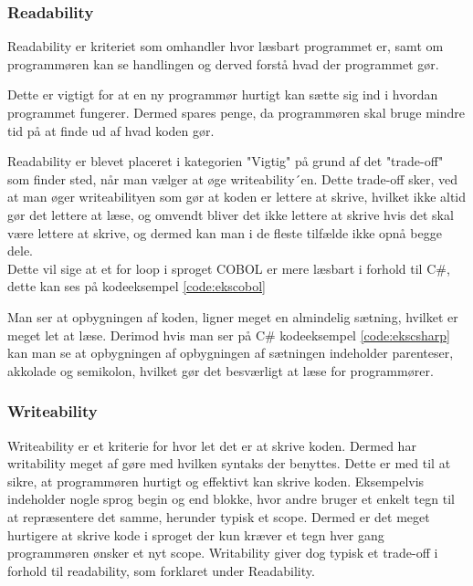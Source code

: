 \subsubsection{Readability} Readability er kriteriet som omhandler hvor læsbart programmet er, samt om programmøren kan se handlingen og derved forstå hvad der programmet gør.

Dette er vigtigt for at en ny programmør hurtigt kan sætte sig ind i hvordan programmet fungerer. Dermed spares penge, da programmøren skal bruge mindre tid på at finde ud af hvad koden gør. 

\noindent Readability er blevet placeret i kategorien "Vigtig" på grund af det "trade-off" som finder sted, når man vælger at øge writeability´en.
Dette trade-off sker, ved at man øger writeabilityen som gør at koden er lettere at skrive, hvilket ikke altid gør det lettere at læse, og omvendt bliver det ikke lettere at skrive hvis det skal være lettere at skrive, og dermed kan man i de fleste tilfælde ikke opnå begge dele.
\\
Dette vil sige at et for loop i sproget COBOL er mere læsbart i forhold til C\#, dette kan ses på kodeeksempel \ref{code:ekscobol}


\noindent Man ser at opbygningen af koden, ligner meget en almindelig sætning, hvilket er meget let at læse. Derimod hvis man ser på C\# kodeeksempel \ref{code:ekscsharp} kan man se at opbygningen af opbygningen af sætningen indeholder parenteser, akkolade og semikolon, hvilket gør det besværligt at læse for programmører.


\subsubsection{Writeability} Writeability er et kriterie for hvor let det er at skrive koden. 
Dermed har writability meget af gøre med hvilken syntaks der benyttes. 
Dette er med til at sikre, at programmøren hurtigt og effektivt kan skrive koden.
Eksempelvis indeholder nogle sprog begin og end blokke, hvor andre bruger et enkelt tegn til at repræsentere det samme, herunder typisk et scope. Dermed er det meget hurtigere at skrive kode i sproget der kun kræver et tegn hver gang programmøren ønsker et nyt scope.
Writability giver dog typisk et trade-off i forhold til readability, som forklaret under Readability.\\

